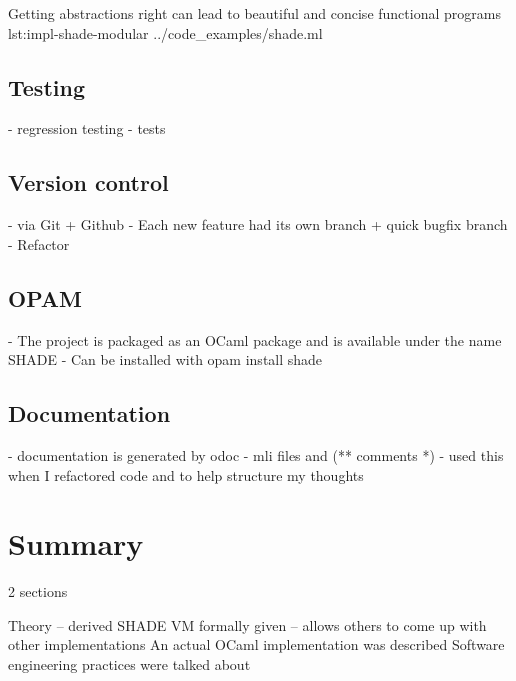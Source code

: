 \documentclass[class=article, crop=false]{standalone}
\begin{document}
{Getting abstractions right can lead to beautiful and concise functional programs}
{lst:impl-shade-modular}
{../code_examples/shade.ml}

\subsection{Testing}
- regression testing
- tests

\subsection{Version control}
- via Git + Github
- Each new feature had its own branch + quick bugfix branch
- Refactor

\subsection{OPAM}
- The project is packaged as an OCaml package and is available under the name SHADE
- Can be installed with opam install shade

\subsection{Documentation}
- documentation is generated by odoc
- mli files and (** comments *)
- used this when I refactored code and to help structure my thoughts

\section{Summary}

2 sections

Theory -- derived
SHADE VM formally given -- allows others to come up with other implementations
An actual OCaml implementation was described
Software engineering practices were talked about
\end{document}
